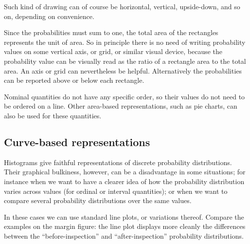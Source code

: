 \documentclass[
  a4paper,
  DIV=11,
  numbers=noendperiod,
  oneside]{scrreprt}
\begin{document}
Such kind of drawing can of course be horizontal, vertical, upside-down,
and so on, depending on convenience.

Since the probabilities must sum to one, the total area of the
rectangles represents the unit of area. So in principle there is no need
of writing probability values on some vertical axis, or grid, or similar
visual device, because the probability value can be visually read as the
ratio of a rectangle area to the total area. An axis or grid can
nevertheless be helpful. Alternatively the probabilities can be reported
above or below each rectangle.

Nominal quantities do not have any specific order, so their values do
not need to be ordered on a line. Other area-based representations, such
as pie charts, can also be used for these quantities.

\hypertarget{curve-based-representations}{%
\subsection{Curve-based
representations}\label{curve-based-representations}}

Histograms give faithful representations of discrete probability
distributions. Their graphical bulkiness, however, can be a disadvantage
in some situations; for instance when we want to have a clearer idea of
how the probability distribution varies across values (for ordinal or
interval quantities); or when we want to compare several probability
distributions over the same values.

In these cases we can use standard line plots, or variations thereof.
Compare the examples on the margin figure: the line plot displays more
cleanly the differences between the ``before-inspection'' and
``after-inspection'' probability distributions.
\end{document}
